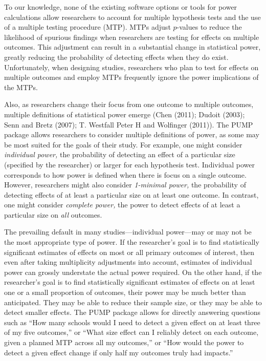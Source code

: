 \documentclass[
]{article}
\begin{document}
To our knowledge, none of the existing software options or tools for
power calculations allow researchers to account for multiple hypothesis
tests and the use of a multiple testing procedure (MTP). MTPs adjust
\(p\)-values to reduce the likelihood of spurious findings when
researchers are testing for effects on multiple outcomes. This
adjustment can result in a substantial change in statistical power,
greatly reducing the probability of detecting effects when they do
exist. Unfortunately, when designing studies, researchers who plan to
test for effects on multiple outcomes and employ MTPs frequently ignore
the power implications of the MTPs.

Also, as researchers change their focus from one outcome to multiple
outcomes, multiple definitions of statistical power emerge (Chen (2011);
Dudoit (2003); Senn and Bretz (2007); T. Westfall Peter H and Wolfinger
(2011)). The PUMP package allows researchers to consider multiple
definitions of power, as some may be most suited for the goals of their
study. For example, one might consider \emph{individual power,} the
probability of detecting an effect of a particular size (specified by
the researcher) or larger for each hypothesis test. Individual power
corresponds to how power is defined when there is focus on a single
outcome. However, researchers might also consider \emph{1-minimal
power,} the probability of detecting effects of at least a particular
size on at least one outcome. In contrast, one might consider
\emph{complete power,} the power to detect effects of at least a
particular size on \emph{all} outcomes.

The prevailing default in many studies---individual power---may or may
not be the most appropriate type of power. If the researcher's goal is
to find statistically significant estimates of effects on most or all
primary outcomes of interest, then even after taking multiplicity
adjustments into account, estimates of individual power can grossly
understate the actual power required. On the other hand, if the
researcher's goal is to find statistically significant estimates of
effects on at least one or a small proportion of outcomes, their power
may be much better than anticipated. They may be able to reduce their
sample size, or they may be able to detect smaller effects. The PUMP
package allows for directly answering questions such as ``How many
schools would I need to detect a given effect on at least three of my
five outcomes,'' or ``What size effect can I reliably detect on each
outcome, given a planned MTP across all my outcomes,'' or ``How would
the power to detect a given effect change if only half my outcomes truly
had impacts.''
\end{document}
